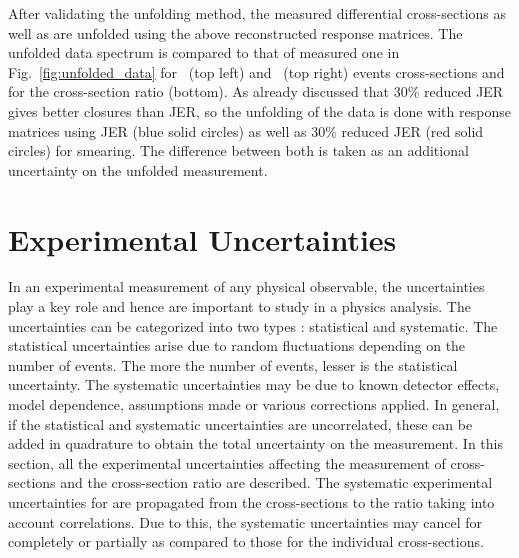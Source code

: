 After validating the unfolding method, the measured differential cross-sections as well as \ratio are unfolded using the above reconstructed response matrices. The unfolded data spectrum is compared to that of measured one in Fig.~\ref{fig:unfolded_data} for \njt~(top left) and \njth~(top right) events cross-sections and for the cross-section ratio \ratio (bottom). As already discussed that 30\% reduced JER gives better closures than JER, so the unfolding of the data is done with response matrices using JER (blue solid circles) as well as 30\% reduced JER (red solid circles) for smearing. The difference between both is taken as an additional uncertainty on the unfolded measurement. %


\section{Experimental Uncertainties}
\label{sec:exp_unc}
In an experimental measurement of any physical observable, the uncertainties play a key role and hence are important to study in a physics analysis. The uncertainties can be categorized into two types : statistical and systematic. The statistical uncertainties arise due to random fluctuations depending on the number of events. The more the number of events, lesser is the statistical uncertainty. The systematic uncertainties may be due to known detector effects, model dependence, assumptions made or various corrections applied. In general, if the statistical and systematic uncertainties are uncorrelated, these can be added in quadrature to obtain the total uncertainty on the measurement. In this section, all the experimental uncertainties affecting the measurement of cross-sections and the cross-section ratio \ratio are described. The systematic experimental uncertainties for \ratio are propagated from the cross-sections to the ratio taking into account correlations. Due to this, the systematic uncertainties may cancel for \ratio completely or partially as compared to those for the individual cross-sections.

